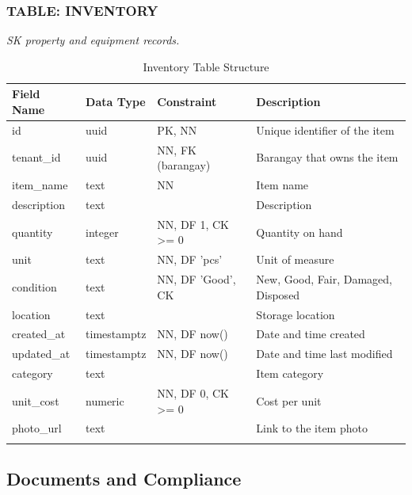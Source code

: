\subsubsection*{TABLE: INVENTORY}
\noindent\textit{SK property and equipment records.}
\begin{longtable}{|p{3.2cm}|p{2.2cm}|p{3.2cm}|p{5.4cm}|}
\hline
\textbf{Field Name} & \textbf{Data Type} & \textbf{Constraint} & \textbf{Description} \\ \hline
\endhead
\hline \endfoot
\hline \endlastfoot
id & uuid & PK, NN & Unique identifier of the item \\ \hline
tenant\_id & uuid & NN, FK (barangay) & Barangay that owns the item \\ \hline
item\_name & text & NN & Item name \\ \hline
description & text & & Description \\ \hline
quantity & integer & NN, DF 1, CK >= 0 & Quantity on hand \\ \hline
unit & text & NN, DF 'pcs' & Unit of measure \\ \hline
condition & text & NN, DF 'Good', CK & New, Good, Fair, Damaged, Disposed \\ \hline
location & text & & Storage location \\ \hline
created\_at & timestamptz & NN, DF now() & Date and time created \\ \hline
updated\_at & timestamptz & NN, DF now() & Date and time last modified \\ \hline
category & text & & Item category \\ \hline
unit\_cost & numeric & NN, DF 0, CK >= 0 & Cost per unit \\ \hline
photo\_url & text & & Link to the item photo \\ \hline
\caption{Inventory Table Structure}
\label{tab:inventory}
\end{longtable}

\subsection{Documents and Compliance}

